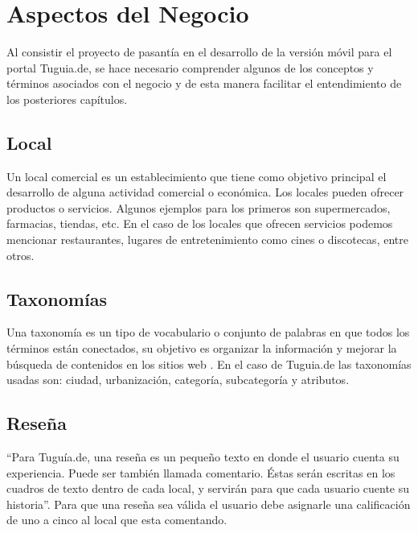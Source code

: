 \section{Aspectos del Negocio} \label{sect:aspectos_negocio}
  
Al consistir el proyecto de pasantía en el desarrollo de la versión móvil para el portal Tuguia.de, se hace necesario comprender algunos de los conceptos y términos asociados con el negocio y de esta manera facilitar el entendimiento de los posteriores capítulos.

\subsection{Local} \label{subsect:local}

Un local comercial es un establecimiento que tiene como objetivo principal el desarrollo de alguna actividad comercial o económica. Los locales pueden ofrecer productos o servicios. Algunos ejemplos para los primeros son supermercados, farmacias, tiendas, etc. En el caso de los locales que ofrecen servicios podemos mencionar restaurantes, lugares de entretenimiento como cines o discotecas, entre otros.\cite{DLC}


\subsection{Taxonomías} \label{subsect:taxonomia}

Una taxonomía es un tipo de vocabulario o conjunto de palabras en que todos los términos están conectados, su objetivo es organizar la información y mejorar la búsqueda de contenidos en los sitios web \cite{CM05}. En el caso de Tuguia.de las taxonomías usadas son: 
ciudad, urbanización, categoría, subcategoría y atributos.

\subsection{Reseña} \label{subsect:resena}

``Para Tuguía.de, una reseña es un pequeño texto en donde el usuario cuenta su experiencia.  Puede ser también llamada comentario. Éstas serán escritas en los cuadros de texto dentro de cada local, y servirán para que cada usuario cuente su historia''\cite{TGD}. Para que una reseña sea válida el usuario debe asignarle una calificación de uno a cinco al local que esta comentando.

 


